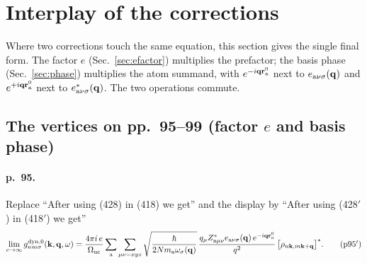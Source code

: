 \documentclass[11pt]{article}
\begin{document}
\section{Interplay of the corrections}\label{sec:interplay}

Where two corrections touch the same equation, this section gives the single final form. The factor $e$
(Sec.~\ref{sec:efactor}) multiplies the prefactor; the basis phase (Sec.~\ref{sec:phase}) multiplies the
atom summand, with $e^{-i\mathbf q\mathbf r^0_{\rm a}}$ next to $e_{{\rm a}\nu\sigma}(\mathbf q)$ and
$e^{+i\mathbf q\mathbf r^0_{\rm a}}$ next to $e^*_{{\rm a}\nu\sigma}(\mathbf q)$. The two operations commute.

\subsection{The vertices on pp.~95--99 (factor $e$ and basis phase)}\label{sec:int-vertices}
\paragraph{p.~95.} Replace ``After using (428) in (418) we get'' and the display by ``After using (428$'$)
in (418$'$) we get''
\begin{equation*}
\lim_{c\to\infty}g^{\rm dyn,0}_{nm\sigma}(\mathbf k,\mathbf q,\omega)=
\frac{4\pi i\,e}{\Omega_{\rm uc}}\sum_{\rm a}\sum_{\mu\nu=xyz}
\sqrt{\frac{\hbar}{2Nm_{\rm a}\omega_\sigma(\mathbf q)}}\,
\frac{q_\mu Z^*_{{\rm a}\mu\nu}e_{{\rm a}\nu\sigma}(\mathbf q)\,e^{-i\mathbf q\mathbf r^0_{\rm a}}}{q^2}\,
\big[\rho_{n\mathbf k,m\mathbf k+\mathbf q}\big]^* .
\tag{p95$'$}
\end{equation*}
\end{document}
